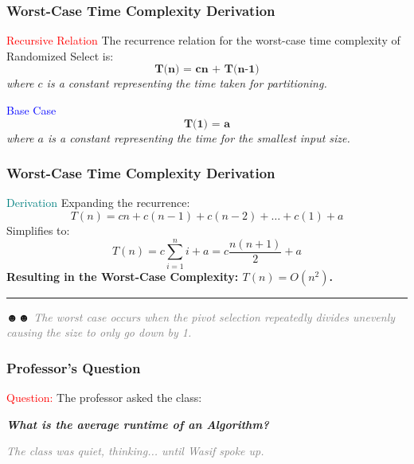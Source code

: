 \begin{frame}
    \frametitle{Worst-Case Time Complexity Derivation}
    \vspace{0.3cm}

    \begin{block}{\textcolor{red}{Recursive Relation}}
        The recurrence relation for the worst-case time complexity of Randomized Select is:
        \[
        \textbf{T(n) = cn + T(n-1)}
        \]
        \textit{where \(c\) is a constant representing the time taken for partitioning.}
    \end{block}
    \vspace{0.4cm}

    \begin{block}{\textcolor{blue}{Base Case}}
        \[
        \textbf{T(1) = a}
        \]
        \textit{where \(a\) is a constant representing the time for the smallest input size.}
    \end{block}
    \vspace{0.4cm}

\end{frame}
\begin{frame}
    \frametitle{Worst-Case Time Complexity Derivation}
    \vspace{0.3cm}
    \begin{block}{\textcolor{teal}{Derivation}}
        Expanding the recurrence:
        \[
        T(n) = cn + c(n-1) + c(n-2) + \dots + c(1) + a
        \]
        Simplifies to:
        \[
        T(n) = c \sum_{i=1}^{n} i + a = c \frac{n(n+1)}{2} + a
        \]
        \textbf{Resulting in the Worst-Case Complexity: \(T(n) = O(n^2)\).}
    \end{block}

    \vspace{0.6cm}
    \hrule %
    \centering
    \vspace{0.2cm}☻☻
    \textit{\textcolor{gray}{The worst case occurs when the pivot selection repeatedly divides unevenly causing the size to only go down by 1.}}

\end{frame}


\begin{frame}
    \frametitle{Professor's Question}
    \vspace{0.4cm} %

    \begin{block}{\textcolor{red}{Question:}}
        The professor asked the class:
        \begin{center}
            \textit{\textbf{What is the average runtime of an Algorithm?}}
        \end{center}
    \end{block}
    
    \vspace{0.6cm} %
    \begin{center}
        \textit{\textcolor{gray}{The class was quiet, thinking... until Wasif spoke up.}}
    \end{center}
\end{frame}



